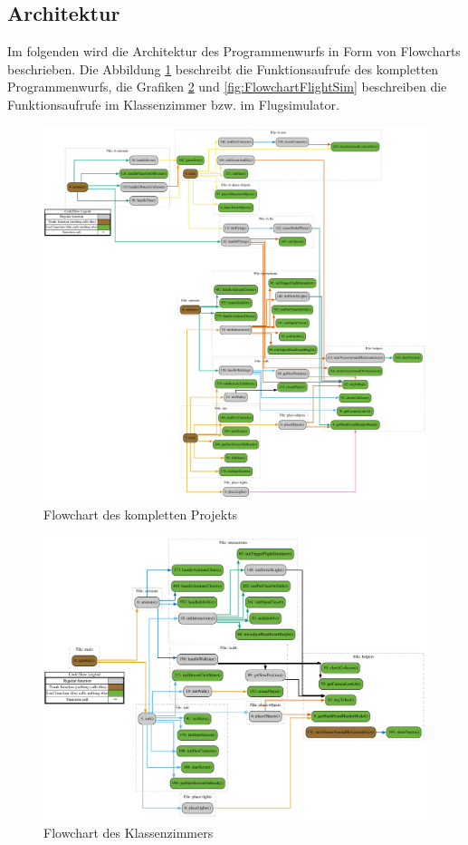 \subsection{Architektur}
Im folgenden wird die Architektur des Programmenwurfs in Form von Flowcharts beschrieben.
Die Abbildung \ref{fig:FlowchartComplete} beschreibt die Funktionsaufrufe des kompletten Programmenwurfs, die Grafiken
\ref{fig:FlowchartRoot} und \ref{fig:FlowchartFlightSim} beschreiben die Funktionsaufrufe im Klassenzimmer bzw. im Flugsimulator.
\begin{figure}[H]
  \centering
  \includegraphics[width=1\textwidth]{images/flowchart/complete.pdf}
  \caption{Flowchart des kompletten Projekts}
  \label{fig:FlowchartComplete}
\end{figure}\noindent
\begin{figure}[H]
  \centering
  \includegraphics[width=1\textwidth]{images/flowchart/root.pdf}
  \caption{Flowchart des Klassenzimmers}
  \label{fig:FlowchartRoot}
\end{figure}\noindent
